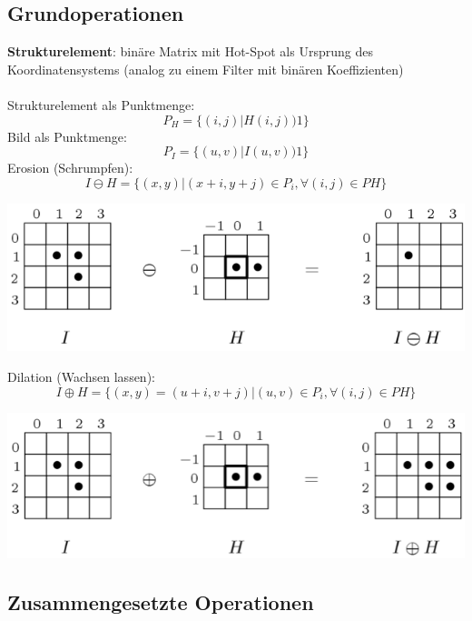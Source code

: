 \documentclass[10pt]{article}
\begin{document}
\subsection{Grundoperationen}
\textbf{Strukturelement}: binäre Matrix mit Hot-Spot als Ursprung des Koordinatensystems (analog zu einem Filter mit binären Koeffizienten) \\
\\
Strukturelement als Punktmenge:
\begin{equation*}
	P_H=\{(i,j)|H(i,j) ) 1 \}
\end{equation*}
Bild als Punktmenge:
\begin{equation*}
	P_I=\{(u,v)|I(u,v) ) 1 \}
\end{equation*}
Erosion (Schrumpfen):
\begin{equation*}
	I \ominus H=\{ (x,y) | (x + i, y + j) \in P_i, \forall (i,j) \in PH \}
\end{equation*}
\begin{center}
	\includegraphics[scale=0.25]{erosion.png}
\end{center}
Dilation (Wachsen lassen):
\begin{equation*}
	I \oplus H=\{ (x,y) = (u + i, v + j) | (u, v) \in P_i, \forall (i,j) \in PH \}
\end{equation*}
\begin{center}
	\includegraphics[scale=0.25]{dilation.png}
\end{center}

\subsection{Zusammengesetzte Operationen}
\end{document}
